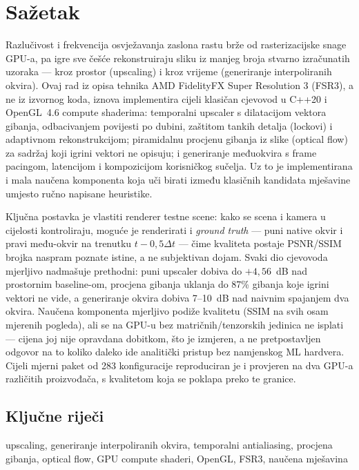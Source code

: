 \documentclass{mathos}
\begin{document}
\chapter*{Sažetak}

Razlučivost i frekvencija osvježavanja zaslona rastu brže od
rasterizacijske snage GPU-a, pa igre sve češće rekonstruiraju sliku iz
manjeg broja stvarno izračunatih uzoraka — kroz prostor (upscaling) i kroz
vrijeme (generiranje interpoliranih okvira). Ovaj rad iz opisa tehnika AMD
FidelityFX Super Resolution 3 (FSR3), a ne iz izvornog koda, iznova
implementira cijeli klasičan cjevovod u C++20 i OpenGL~4.6 compute
shaderima: temporalni upscaler s dilatacijom vektora gibanja, odbacivanjem
povijesti po dubini, zaštitom tankih detalja (lockovi) i adaptivnom
rekonstrukcijom; piramidalnu procjenu gibanja iz slike (optical flow) za
sadržaj koji igrini vektori ne opisuju; i generiranje međuokvira s
frame pacingom, latencijom i kompozicijom korisničkog sučelja. Uz to je
implementirana i mala naučena komponenta koja uči birati između klasičnih
kandidata mješavine umjesto ručno napisane heuristike.

Ključna postavka je vlastiti renderer testne scene: kako se scena i kamera
u cijelosti kontroliraju, moguće je renderirati i \emph{ground truth} — puni
native okvir i pravi među-okvir na trenutku $t-0,5\Delta t$ — čime kvaliteta
postaje PSNR/SSIM brojka naspram poznate istine, a ne subjektivan dojam.
Svaki dio cjevovoda mjerljivo nadmašuje prethodni: puni upscaler dobiva do
$+4,56$~dB nad prostornim baseline-om, procjena gibanja uklanja do 87\%
gibanja koje igrini vektori ne vide, a generiranje okvira dobiva 7--10~dB
nad naivnim spajanjem dva okvira. Naučena komponenta mjerljivo podiže
kvalitetu (SSIM na svih osam mjerenih pogleda), ali se na GPU-u bez
matričnih/tenzorskih jedinica ne isplati — cijena joj nije opravdana
dobitkom, što je izmjeren, a ne pretpostavljen odgovor na to koliko daleko
ide analitički pristup bez namjenskog ML hardvera. Cijeli mjerni paket od
283 konfiguracije reproduciran je i provjeren na dva GPU-a različitih
proizvođača, s kvalitetom koja se poklapa preko te granice.

\section*{Ključne riječi}

upscaling, generiranje interpoliranih okvira, temporalni antialiasing,
procjena gibanja, optical flow, GPU compute shaderi, OpenGL, FSR3,
naučena mješavina
\end{document}

